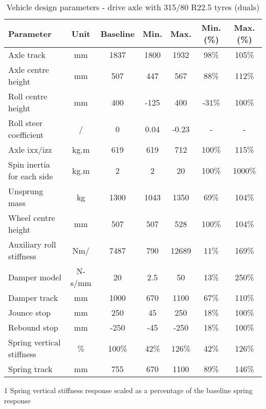 \begin{table}[H]
	\centering\footnotesize
	\begin{threeparttable}

		\begin{tabulary}{\textwidth}{lcccccc}

			\toprule
			\textbf{Parameter} & \textbf{Unit} & \textbf{Baseline} & \textbf{Min.} & \textbf{Max.} & \textbf{Min. (\%)} & \textbf{Max. (\%)} \\

			\midrule
			Axle track & mm    & 1837  & 1800  & 1932  & 98\%  & 105\% \\
			Axle centre height & mm    & 507   & 447   & 567   & 88\%  & 112\% \\
			Roll centre height & mm    & 400   & -125  & 400   & -31\% & 100\% \\
			Roll steer coefficient & \degree{}/\degree{} & 0     & 0.04  & -0.23 & -     & - \\
			Axle \gls{ixx}/\gls{izz}  & kg.m\sstw{} & 619   & 619   & 712   & 100\% & 115\% \\
			Spin inertia for each side & kg.m\sstw{} & 2     & 2     & 20    & 100\% & 1000\% \\
			Unsprung mass  & kg    & 1300  & 1043   & 1350  & 69\%  & 104\% \\
			Wheel centre height & mm    & 507   & 507   & 528   & 100\% & 104\% \\
			Auxiliary roll stiffness  & Nm/\degree{} & 7487  & 790   & 12689 & 11\%  & 169\% \\
			Damper model & N-s/mm & 20    & 2.5   & 50    & 13\%  & 250\% \\
			Damper track & mm    & 1000  & 670   & 1100  & 67\%  & 110\% \\
			Jounce stop & mm    & 250   & 45    & 250   & 18\%  & 100\% \\
			Rebound stop & mm    & -250  & -45   & -250  & 18\%  & 100\% \\
			Spring vertical stiffness & \%  & 100\% & 42\%  & 126\% & 42\%  & 126\% \\
			Spring track & mm    & 755   & 670   & 1100  & 89\%  & 146\% \\

			\bottomrule

		\end{tabulary}

		\caption{Vehicle design parameters - drive axle with 315/80 R22.5 tyres (duals)}
		\label{table:vdp-range-axle-drive-315}

		\begin{tablenotes}
			\item[1] Spring vertical stiffness response scaled as a percentage of the baseline spring response
		\end{tablenotes}

	\end{threeparttable}
\end{table}

